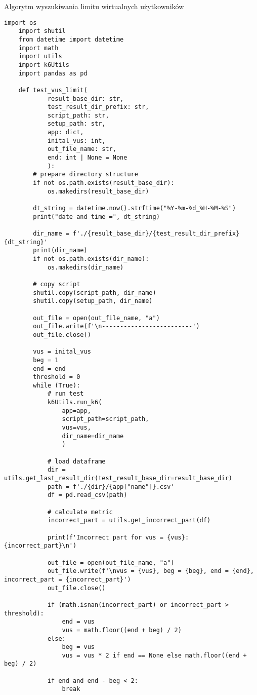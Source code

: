 \begin{easyappendix}{Algorytm wyszukiwania limitu wirtualnych użytkowników}
\begin{lstlisting}[frame=single]  % Start your code-block
    import os
    import shutil
    from datetime import datetime
    import math
    import utils
    import k6Utils
    import pandas as pd
    
    def test_vus_limit(
            result_base_dir: str,
            test_result_dir_prefix: str,
            script_path: str,
            setup_path: str,
            app: dict,
            inital_vus: int,
            out_file_name: str,
            end: int | None = None
            ):
        # prepare directory structure
        if not os.path.exists(result_base_dir):
            os.makedirs(result_base_dir)
    
        dt_string = datetime.now().strftime("%Y-%m-%d_%H-%M-%S")
        print("date and time =", dt_string)
    
        dir_name = f'./{result_base_dir}/{test_result_dir_prefix}{dt_string}'
        print(dir_name)
        if not os.path.exists(dir_name):
            os.makedirs(dir_name)
            
        # copy script
        shutil.copy(script_path, dir_name)
        shutil.copy(setup_path, dir_name)
    
        out_file = open(out_file_name, "a")
        out_file.write(f'\n-------------------------')
        out_file.close()
    
        vus = inital_vus
        beg = 1
        end = end
        threshold = 0
        while (True):
            # run test
            k6Utils.run_k6(
                app=app,
                script_path=script_path,
                vus=vus,
                dir_name=dir_name
                )
    
            # load dataframe
            dir = utils.get_last_result_dir(test_result_base_dir=result_base_dir)
            path = f'./{dir}/{app["name"]}.csv'
            df = pd.read_csv(path)
    
            # calculate metric
            incorrect_part = utils.get_incorrect_part(df)
                
            print(f'Incorrect part for vus = {vus}: {incorrect_part}\n')
    
            out_file = open(out_file_name, "a")
            out_file.write(f'\nvus = {vus}, beg = {beg}, end = {end}, incorrect_part = {incorrect_part}')
            out_file.close()
    
            if (math.isnan(incorrect_part) or incorrect_part > threshold):
                end = vus
                vus = math.floor((end + beg) / 2)
            else:
                beg = vus
                vus = vus * 2 if end == None else math.floor((end + beg) / 2)
            
            if end and end - beg < 2:
                break
\end{lstlisting}
% 
\end{easyappendix}

